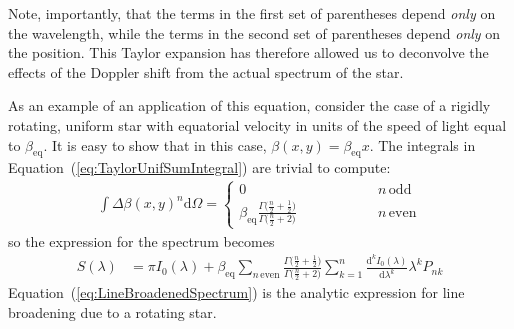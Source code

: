 \documentclass[modern]{aastex62}
\begin{document}
Note, importantly, that the terms in the first set of parentheses depend \emph{only} on the wavelength,
while the terms in the second set of parentheses depend \emph{only} on the position.
This Taylor expansion has therefore allowed us to deconvolve the effects of the Doppler
shift from the actual spectrum of the star.

As an example of an application of this equation, consider the case of a rigidly rotating,
uniform star with equatorial velocity in units of the speed of light equal to $\beta_\mathrm{eq}$. 
It is easy to show that in this case, $\beta(x, y) = \beta_\mathrm{eq} x$. The integrals
in Equation~(\ref{eq:TaylorUnifSumIntegral}) are trivial to compute:
%
\begin{align}
    \int{\Delta\beta(x, y)^n}\mathrm{d}\Omega = 
        \begin{cases} 
            0 & \quad\quad\quad\quad\quad n \, \mathrm{odd} \\
            \beta_\mathrm{eq}\frac{\Gamma\big(\frac{n}{2} + \frac{1}{2}\big)}{\Gamma\big(\frac{n}{2} + 2\big)} & \quad\quad\quad\quad\quad n \, \mathrm{even}
        \end{cases}
\end{align}
%
so the expression for the spectrum becomes
\begin{align}
    \label{eq:LineBroadenedSpectrum}
    S(\lambda) 
        &=
        \pi I_0(\lambda)
        + 
        \beta_\mathrm{eq}
        \sum_{n\,\mathrm{even}}
            \frac{\Gamma\big(\frac{n}{2} + \frac{1}{2}\big)}{\Gamma\big(\frac{n}{2} + 2\big)}
            \sum_{k=1}^n 
                \frac{\mathrm{d}^k I_0(\lambda)}{\mathrm{d}\lambda^k} \lambda^k P_{nk} 
\end{align}
%
Equation~(\ref{eq:LineBroadenedSpectrum}) is the analytic expression for line broadening
due to a rotating star.



\end{document}

